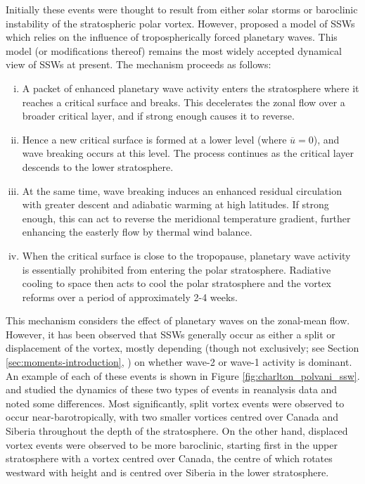 Initially these events were thought to result from either solar storms or
baroclinic instability of the stratospheric polar vortex. However,
\citet{Matsuno1970, Matsuno1971} proposed a model of SSWs which relies on the
influence of tropospherically forced planetary waves. This model (or
modifications thereof) remains the most widely accepted dynamical view of SSWs
at present. The mechanism proceeds as follows:
\begin{enumerate}[i.]
\item A packet of enhanced planetary wave activity enters the stratosphere where
  it reaches a critical surface and breaks. This decelerates the zonal flow over
  a broader critical layer, and if strong enough causes it to reverse.
\item Hence a new critical surface is formed at a lower level (where
  $\overline{u}=0$), and wave breaking occurs at this level. The process
  continues as the critical layer descends to the lower stratosphere.
\item At the same time, wave breaking induces an enhanced residual circulation
  with greater descent and adiabatic warming at high latitudes. If strong
  enough, this can act to reverse the meridional temperature gradient, further
  enhancing the easterly flow by thermal wind balance. 
\item When the critical surface is close to the tropopause, planetary wave
  activity is essentially prohibited from entering the polar
  stratosphere. Radiative cooling to space then acts to cool the polar
  stratosphere and the vortex reforms over a period of approximately 2-4 weeks.
\end{enumerate}

This mechanism considers the effect of planetary waves on the zonal-mean
flow. However, it has been observed that SSWs generally occur as either a split
or displacement of the vortex, mostly depending (though not exclusively; see
Section \ref{sec:moments-introduction}, \citep{Waugh1997}) on whether wave-2 or
wave-1 activity is dominant. An example of each of these events is shown in
Figure \ref{fig:charlton_polvani_ssw}. \citet{Charlton2007a} and
\citet{Matthewman2009} studied the dynamics of these two types of events in
reanalysis data and noted some differences. Most significantly, split vortex
events were observed to occur near-barotropically, with two smaller vortices
centred over Canada and Siberia throughout the depth of the stratosphere. On the
other hand, displaced vortex events were observed to be more baroclinic,
starting first in the upper stratosphere with a vortex centred over Canada, the
centre of which rotates westward with height and is centred over Siberia in the
lower stratosphere.


